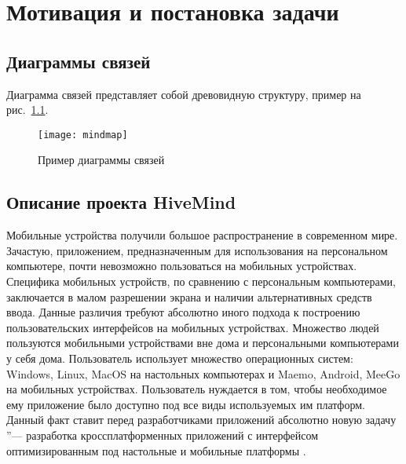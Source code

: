 \newpage

\chapter{Мотивация и постановка задачи}
\label{ch:chapter_1}

\section{Диаграммы связей}
\label{sec:mindmaps}
Диаграмма связей представляет собой древовидную структуру, пример на
рис.~\ref{pic:mindmap}.

\begin{figure}[h!]
  \centering
  \texttt{[image: mindmap]}
  \caption{Пример диаграммы связей}
  \label{pic:mindmap}
\end{figure}



\section{Описание проекта HiveMind}
\label{sec:project_summary}
Мобильные устройства получили большое распространение в современном мире.
Зачастую, приложением, предназначенным для использования на персональном
компьютере, почти невозможно пользоваться на мобильных устройствах. Специфика
мобильных устройств, по сравнению с персональным компьютерами, заключается в
малом разрешении экрана и наличии альтернативных средств ввода. Данные различия
требуют абсолютно иного подхода к построению пользовательских интерфейсов на
мобильных устройствах. Множество людей пользуются мобильными устройствами вне
дома и персональными компьютерами у себя дома. Пользователь использует множество
операционных систем: Windows, Linux, MacOS на настольных компьютерах и Maemo,
Android, MeeGo на мобильных устройствах. Пользователь нуждается в том, чтобы
необходимое ему приложение было доступно под все виды используемых им платформ.
Данный факт ставит перед разработчиками приложений абсолютно новую задачу  ''---
разработка кроссплатформенных приложений с интерфейсом оптимизированным под
настольные и мобильные платформы \cite{hivemind-8th-fruct}.

